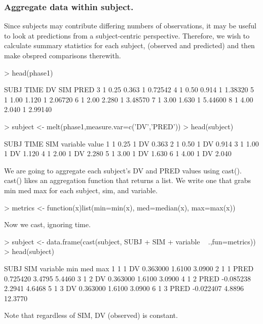 \subsubsection{Aggregate data within subject.}
Since subjects may contribute differing numbers of observations, it may
be useful to look at predictions from a subject-centric perspective.
Therefore, we wish to calculate summary statistics for each subject, 
(observed and predicted) and then make obspred comparisons therewith.
\begin{Schunk}
\begin{Sinput}
> head(phase1)
\end{Sinput}
\begin{Soutput}
  SUBJ TIME    DV SIM    PRED
3    1 0.25 0.363   1 0.72542
4    1 0.50 0.914   1 1.38320
5    1 1.00 1.120   1 2.06720
6    1 2.00 2.280   1 3.48570
7    1 3.00 1.630   1 5.44600
8    1 4.00 2.040   1 2.99140
\end{Soutput}
\begin{Sinput}
> subject <- melt(phase1,measure.var=c('DV','PRED'))
> head(subject)
\end{Sinput}
\begin{Soutput}
  SUBJ TIME SIM variable value
1    1 0.25   1       DV 0.363
2    1 0.50   1       DV 0.914
3    1 1.00   1       DV 1.120
4    1 2.00   1       DV 2.280
5    1 3.00   1       DV 1.630
6    1 4.00   1       DV 2.040
\end{Soutput}
\end{Schunk}
We are going to aggregate each subject's DV and PRED values using cast().
cast() likes an aggregation function that returns a list.
We write one that grabs min med max for each subject, sim, and variable.
\begin{Schunk}
\begin{Sinput}
> metrics <- function(x)list(min=min(x), med=median(x), max=max(x))
\end{Sinput}
\end{Schunk}
Now we cast, ignoring time.
\begin{Schunk}
\begin{Sinput}
> subject <- data.frame(cast(subject, SUBJ + SIM + variable ~ .,fun=metrics))
> head(subject)
\end{Sinput}
\begin{Soutput}
  SUBJ SIM variable       min    med     max
1    1   1       DV  0.363000 1.6100  3.0900
2    1   1     PRED  0.725420 3.4795  5.4460
3    1   2       DV  0.363000 1.6100  3.0900
4    1   2     PRED -0.085238 2.2941  4.6468
5    1   3       DV  0.363000 1.6100  3.0900
6    1   3     PRED -0.022407 4.8896 12.3770
\end{Soutput}
\end{Schunk}
Note that regardless of SIM, DV (observed) is constant.

